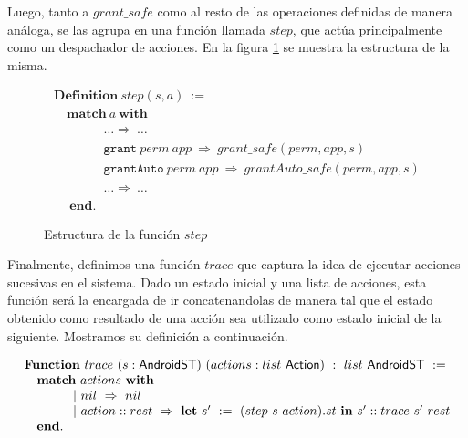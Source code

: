 Luego, tanto a $grant\_safe$ como al resto de las operaciones definidas de manera análoga, se las
agrupa en una función llamada $step$, que actúa principalmente como un despachador de acciones. En
la figura \ref{fig:step} se muestra la estructura de la misma.

\begin{figure}[ht]
    \begin{displaymath}
        \begin{array}{l}
            \textbf{Definition}\ step(s,a)\ :=\                                                               \\
            \quad \textbf{match}\ a\ \textbf{with}                                                            \\
            \quad  \hspace{1cm} |\ \ldots \Rightarrow\ \ldots                                                 \\
            \quad  \hspace{1cm} |\  \texttt{grant}\ perm\ app\ \Rightarrow\ grant\_safe(perm, app, s)         \\
            \quad  \hspace{1cm} |\  \texttt{grantAuto}\ perm\ app\ \Rightarrow\ grantAuto\_safe(perm, app, s) \\
            \quad  \hspace{1cm} |\ \ldots \Rightarrow\ \ldots                                                 \\
            \quad\ \textbf{end}.
        \end{array}
    \end{displaymath}
    \caption{Estructura de la función $step$}
    \label{fig:step}
\end{figure}

Finalmente, definimos una función $trace$ que captura la idea de ejecutar acciones sucesivas en el
sistema. Dado un estado inicial y una lista de acciones, esta función será la encargada de ir
concatenandolas de manera tal que el estado obtenido como resultado de una acción sea utilizado como
estado inicial de la siguiente. Mostramos su definición a continuación.

\begin{displaymath}
    \begin{array}{l}
        \textbf{Function}\ trace\ (s:\AndroidState)\ (actions:list\ \Action)\ :\ list\ \AndroidState \ :=                             \\
        \quad \textbf{match}\ actions\ \textbf{with}                                                                                  \\
        \quad \hspace{1cm} |\ nil\ \Rightarrow\ nil                                                                                   \\
        \quad \hspace{1cm} |\ action::rest\ \Rightarrow\ \textbf{let}\ s'\ :=\ (step\ s\ action).st\ \textbf{in}\ s'::trace\ s'\ rest \\
        \quad \textbf{end}.
    \end{array}
\end{displaymath}

